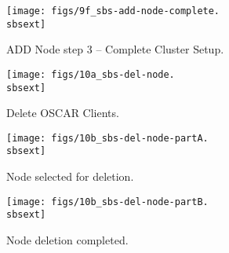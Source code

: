 \clearpage

\begin{figure}[htbp]
  \begin{center}
    \texttt{[image: figs/9f\_sbs-add-node-complete.\\sbsext]}
    \caption{ADD Node step 3 -- Complete Cluster Setup.}
    \label{fig:sbs-add-node1-cluster-setup}
  \end{center}
\end{figure}


\begin{figure}[htbp]
  \begin{center}
    \texttt{[image: figs/10a\_sbs-del-node.\\sbsext]}
    \caption{Delete OSCAR Clients.}
    \label{fig:sbs-del-node1}
  \end{center}
\end{figure}


\begin{figure}[htbp]
  \begin{center}
    \texttt{[image: figs/10b\_sbs-del-node-partA.\\sbsext]}
    \caption{Node selected for deletion.}
    \label{fig:sbs-del-node1-done-partA}
  \end{center}
\end{figure}

\begin{figure}[htbp]
  \begin{center}
    \texttt{[image: figs/10b\_sbs-del-node-partB.\\sbsext]}
    \caption{Node deletion completed.}
    \label{fig:sbs-del-node1-done-partB}
  \end{center}
\end{figure}

